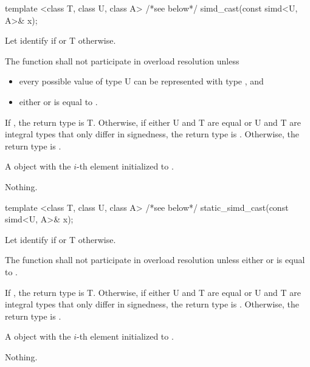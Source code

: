 \begin{itemdecl}
template <class T, class U, class A> /*see below*/ simd_cast(const simd<U, A>& x);
\end{itemdecl}
\begin{itemdescr}
  \pnum\remarks Let  identify  if  or \type T otherwise.

  \pnum\remarks The function shall not participate in overload resolution unless
  \begin{itemize}
    \item every possible value of type \type U can be represented with type , and
    \item either  or  is equal to .
  \end{itemize}

  \pnum\remarks If , the return type is \type T.
  Otherwise, if either \type U and \type T are equal or \type U and \type T are integral types that only differ in signedness, the return type is \simd[<T, A>].
  Otherwise, the return type is .

  \pnum\returns A \simd object with the $i$-th element initialized to .

  \pnum\throws Nothing.
\end{itemdescr}

\begin{itemdecl}
template <class T, class U, class A> /*see below*/ static_simd_cast(const simd<U, A>& x);
\end{itemdecl}
\begin{itemdescr}
  \pnum\remarks Let  identify  if  or \type T otherwise.

  \pnum\remarks The function shall not participate in overload resolution unless either  or  is equal to .

  \pnum\remarks If , the return type is \type T.
  Otherwise, if either \type U and \type T are equal or \type U and \type T are integral types that only differ in signedness, the return type is \simd[<T, A>].
  Otherwise, the return type is .

  \pnum\returns A \simd object with the $i$-th element initialized to .

  \pnum\throws Nothing.
\end{itemdescr}

